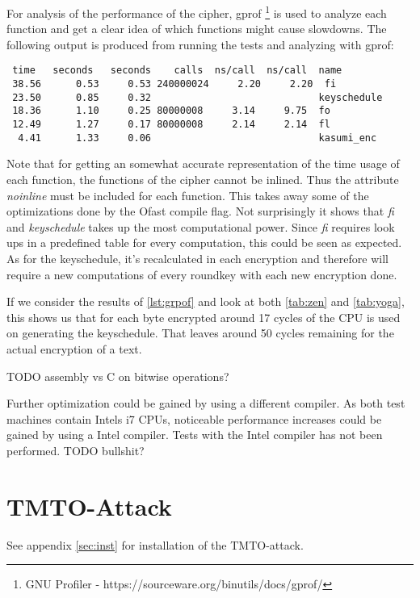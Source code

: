 For analysis of the performance of the cipher, gprof \footnote{GNU
  Profiler - https://sourceware.org/binutils/docs/gprof/} is used to
analyze each function and get a clear idea of which functions might
cause slowdowns. The following output is produced from running the
tests and analyzing with gprof:
\begin{lstlisting}[caption=Gprof output,captionpos=b,label=lst:grpof]
    %   cumulative   self              self     total
 time   seconds   seconds    calls  ns/call  ns/call  name
 38.56      0.53     0.53 240000024     2.20     2.20  fi
 23.50      0.85     0.32                             keyschedule
 18.36      1.10     0.25 80000008     3.14     9.75  fo
 12.49      1.27     0.17 80000008     2.14     2.14  fl
  4.41      1.33     0.06                             kasumi_enc
\end{lstlisting}
Note that for getting an somewhat accurate representation of the time usage of
each function, the functions of the cipher cannot be inlined. Thus the
attribute \textit{noinline} must be included for each function. This
takes away some of the optimizations done by the Ofast compile
flag. Not surprisingly it shows that \textit{fi} and
\textit{keyschedule} takes up the most computational
power. Since \textit{fi} requires look ups in a predefined table for every computation, this
could be seen as expected. As for the keyschedule, it's recalculated
in each encryption and therefore will require a new computations of
every roundkey with each new encryption done.

If we consider the results of \ref{lst:grpof} and look at both
\ref{tab:zen} and \ref{tab:yoga}, this shows us that for each byte
encrypted around 17 cycles of the CPU is used on generating the
keyschedule. That leaves around 50 cycles remaining for the actual
encryption of a text.

TODO assembly vs C on bitwise operations?

Further optimization could be gained by using a different compiler. As
both test machines contain Intels i7 CPUs, noticeable performance
increases could be gained by using a Intel compiler. Tests with the
Intel compiler has not been performed. TODO bullshit?


\section{TMTO-Attack}

See appendix \ref{sec:inst} for installation of the TMTO-attack.

